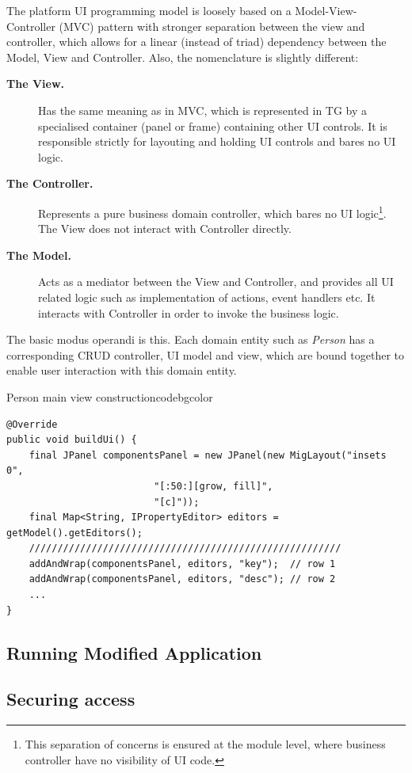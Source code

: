   The platform UI programming model is loosely based on a Model-View-Controller (MVC) pattern with stronger separation between the view and controller, which allows for a linear (instead of triad) dependency between the Model, View and Controller.
  Also, the nomenclature is slightly different:
  \begin{description}
    \item[\textbf{The View.}] Has the same meaning as in MVC, which is represented in TG by a specialised container (panel or frame) containing other UI controls. It is responsible strictly for layouting and holding UI controls and bares no UI logic.
    \item[\textbf{The Controller.}] Represents a pure business domain controller, which bares no UI logic\footnote{This separation of concerns is ensured at the module level, where business controller have no visibility of UI code.}. The View does not interact with Controller directly.
    \item [\textbf{The Model.}] Acts as a mediator between the View and Controller, and provides all UI related logic such as implementation of actions, event handlers etc. It interacts with Controller in order to invoke the business logic.
  \end{description}

  The basic modus operandi is this.
  Each domain entity such as \emph{Person} has a corresponding CRUD controller, UI model and view, which are bound together to enable user interaction with this domain entity.

 \begin{code}{Person main view construction}{\label{lst:Person-birthday-validation}}{codebgcolor}
    \begin{lstlisting}
@Override
public void buildUi() {
    final JPanel componentsPanel = new JPanel(new MigLayout("insets 0", 
					      "[:50:][grow, fill]", 
					      "[c]"));
    final Map<String, IPropertyEditor> editors = getModel().getEditors();
    ///////////////////////////////////////////////////////    
    addAndWrap(componentsPanel, editors, "key");  // row 1    
    addAndWrap(componentsPanel, editors, "desc"); // row 2
    ...
}
    \end{lstlisting}
  \end{code}


\subsection{Running Modified Application}

\subsection{Securing access}